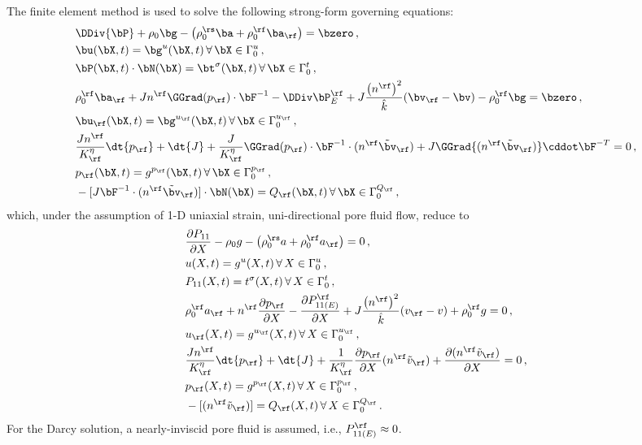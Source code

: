 The finite element method is used to solve the following strong-form governing equations:
\begin{align}
\label{eq:Variational_Strong-Forms-deBoer}
    \begin{aligned}
        &\DDiv{\bP} + \rho_0\bg - \left(\rho_0^\rs\ba + \rho_0^\rf\ba_\rf\right) = \bzero\, ,\\
        &\bu(\bX, t) = \bg^u(\bX,t)\, \forall \, \bX \in \Gamma_0^u\, ,\\
        &\bP(\bX, t) \cdot \bN(\bX) = \bt^\sigma(\bX,t) \, \forall \, \bX \in \Gamma_0^t\, ,\\
        &\rho_0^\rf\ba_\rf + Jn^\rf\GGrad(p_\rf)\cdot\bF^{-1} - \DDiv\bP_E^\rf + J\frac{\left(n^\rf\right)^2}{\hat{k}}(\bv_\rf - \bv) - \rho_0^\rf\bg = \bzero\, ,\\
        &\bu_\rf(\bX,t) = \bg^{u_\rf}(\bX,t) \, \forall \, \bX \in \Gamma_0^{u_\rf}\, ,\\
        &\frac{J n^\rf}{K^\eta_\rf}\dt{p_\rf} + \dt{J} + \frac{J}{K^\eta_\rf}\GGrad(p_\rf)\cdot\bF^{-1}\cdot(n^\rf\tilde{\bv}_\rf) + J\GGrad{(n^\rf\tilde{\bv}_\rf)}\cddot\bF^{-T} = 0\, ,\\
        &p_\rf(\bX,t) = g^{p_\rf}(\bX,t)\, \forall \, \bX \in \Gamma_0^{p_\rf}\, ,\\
        &-[J\bF^{-1}\cdot(n^\rf\tilde{\bv}_\rf)]\cdot\bN(\bX) = Q_\rf(\bX,t)\, \forall \, \bX \in \Gamma_0^{Q_\rf}\, ,
    \end{aligned}
\end{align}
which, under the assumption of 1-D uniaxial strain, uni-directional pore fluid flow, reduce to
\begin{align}
\label{eq:Variational_Strong-Forms-1D-deBoer}
    \begin{aligned}
        &\frac{\partial P_{11}}{\partial X} - \rho_0g - \left(\rho_0^\rs a + \rho_0^\rf a_\rf\right) = 0\, ,\\
        &u(X, t) = g^u(X,t)\, \forall \, X \in \Gamma_0^u\, ,\\
        &P_{11}(X, t) = t^\sigma(X,t) \, \forall \, X \in \Gamma_0^t\, ,\\
        &\rho_0^\rf a_\rf + n^\rf\frac{\partial p_\rf}{\partial X} - \frac{\partial P_{11(E)}^\rf}{\partial X} + J\frac{\left(n^\rf\right)^2}{\hat{k}}(v_\rf - v) + \rho_0^\rf g = 0\, ,\\
        &u_\rf(X,t) = g^{u_\rf}(X,t) \, \forall \, X \in \Gamma_0^{u_\rf}\, ,\\
        &\frac{J n^\rf}{K^\eta_\rf}\dt{p_\rf} + \dt{J} + \frac{1}{K^\eta_\rf}\frac{\partial p_\rf}{\partial X}(n^\rf\tilde{v}_\rf) + \frac{\partial(n^\rf\tilde{v}_\rf)}{\partial X} = 0\, ,\\
        &p_\rf(X,t) = g^{p_\rf}(X,t)\, \forall \, X \in \Gamma_0^{p_\rf}\, ,\\
        &-[(n^\rf\tilde{v}_\rf)] = Q_\rf(X,t)\, \forall \, X \in \Gamma_0^{Q_\rf}\, .
    \end{aligned}
\end{align}
For the Darcy solution, a nearly-inviscid pore fluid is assumed, i.e., $P_{11(E)}^\rf \approx 0$.\\


